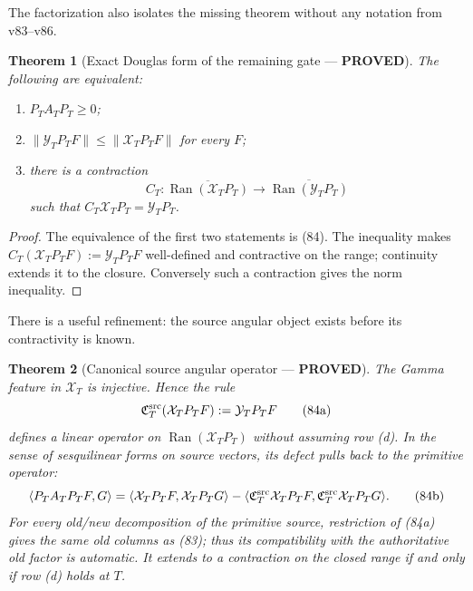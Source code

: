 \documentclass[11pt]{article}
\newtheorem{theorem}{Theorem}
\newcommand{\PROVED}{\textcolor{green!45!black}{\textbf{PROVED}}}
\newcommand{\Ran}{\operatorname{Ran}}
\begin{document}
The factorization also isolates the missing theorem without any notation
from v83--v86.

\begin{theorem}[Exact Douglas form of the remaining gate --- \PROVED]
The following are equivalent:
\begin{enumerate}
\item $P_TA_TP_T\ge0$;
\item $\|\mathcal Y_TP_TF\|\le\|\mathcal X_TP_TF\|$ for every $F$;
\item there is a contraction
\[
 C_T:\overline{\Ran(\mathcal X_TP_T)}
       \longrightarrow\overline{\Ran(\mathcal Y_TP_T)}
 \]
such that $C_T\mathcal X_TP_T=\mathcal Y_TP_T$.
\end{enumerate}
\end{theorem}

\begin{proof}
The equivalence of the first two statements is (84).  The inequality makes
$C_T(\mathcal X_TP_TF):=\mathcal Y_TP_TF$ well-defined and contractive on
the range; continuity extends it to the closure.  Conversely such a
contraction gives the norm inequality.
\end{proof}

There is a useful refinement: the source angular object exists before its
contractivity is known.

\begin{theorem}[Canonical source angular operator --- \PROVED]
The Gamma feature in $\mathcal X_T$ is injective.  Hence the rule
\begin{equation}
 \mathfrak C_T^{\rm src}(\mathcal X_TP_TF)
 :=\mathcal Y_TP_TF                                    \tag{84a}
\end{equation}
defines a linear operator on $\Ran(\mathcal X_TP_T)$ without assuming row
(d).  In the sense of sesquilinear forms on source vectors, its defect pulls
back to the primitive operator:
\begin{equation}
 \langle P_TA_TP_TF,G\rangle
 =\langle\mathcal X_TP_TF,\mathcal X_TP_TG\rangle
 -\langle\mathfrak C_T^{\rm src}\mathcal X_TP_TF,
          \mathfrak C_T^{\rm src}\mathcal X_TP_TG\rangle. \tag{84b}
\end{equation}
For every old/new decomposition of the primitive source, restriction of
(84a) gives the same old columns as (83); thus its compatibility with the
authoritative old factor is automatic.  It extends to a contraction on the
closed range if and only if row (d) holds at $T$.
\end{theorem}
\end{document}
